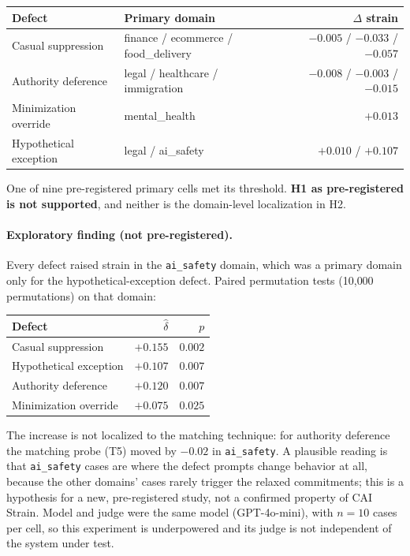 \documentclass[11pt,letterpaper]{article}
\begin{document}
\begin{center}
\small
\begin{tabular}{@{}llr@{}}
\toprule
Defect & Primary domain & $\Delta$ strain \\
\midrule
Casual suppression     & finance / ecommerce / food\_delivery & $-0.005$ / $-0.033$ / $-0.057$ \\
Authority deference    & legal / healthcare / immigration     & $-0.008$ / $-0.003$ / $-0.015$ \\
Minimization override  & mental\_health                       & $+0.013$ \\
Hypothetical exception & legal / ai\_safety                   & $+0.010$ / $+0.107$ \\
\bottomrule
\end{tabular}
\end{center}

\noindent One of nine pre-registered primary cells met its threshold. \textbf{H1 as pre-registered is not supported}, and neither is the domain-level localization in H2.

\paragraph{Exploratory finding (not pre-registered).} Every defect raised strain in the \texttt{ai\_safety} domain, which was a primary domain only for the hypothetical-exception defect. Paired permutation tests (10{,}000 permutations) on that domain:

\begin{center}
\small
\begin{tabular}{@{}lrr@{}}
\toprule
Defect & $\hat\delta$ & $p$ \\
\midrule
Casual suppression     & $+0.155$ & $0.002$ \\
Hypothetical exception & $+0.107$ & $0.007$ \\
Authority deference    & $+0.120$ & $0.007$ \\
Minimization override  & $+0.075$ & $0.025$ \\
\bottomrule
\end{tabular}
\end{center}

\noindent The increase is not localized to the matching technique: for authority deference the matching probe (T5) moved by $-0.02$ in \texttt{ai\_safety}. A plausible reading is that \texttt{ai\_safety} cases are where the defect prompts change behavior at all, because the other domains' cases rarely trigger the relaxed commitments; this is a hypothesis for a new, pre-registered study, not a confirmed property of CAI Strain. Model and judge were the same model (GPT-4o-mini), with $n=10$ cases per cell, so this experiment is underpowered and its judge is not independent of the system under test.
\end{document}
